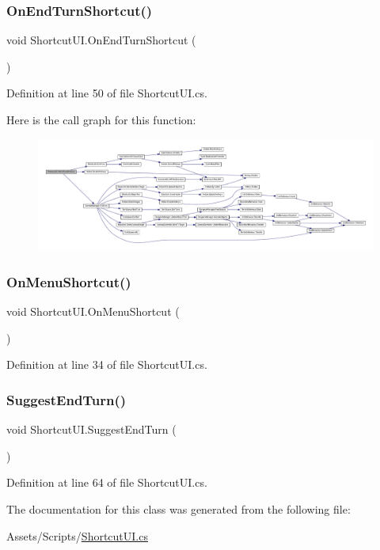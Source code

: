 \subsubsection{\texorpdfstring{OnEndTurnShortcut()}{OnEndTurnShortcut()}}
{\footnotesize\ttfamily void Shortcut\+U\+I.\+On\+End\+Turn\+Shortcut (\begin{DoxyParamCaption}{ }\end{DoxyParamCaption})}



Definition at line 50 of file Shortcut\+U\+I.\+cs.

Here is the call graph for this function\+:
\nopagebreak
\begin{figure}[H]
\begin{center}
\leavevmode
\includegraphics[width=350pt]{class_shortcut_u_i_ac6c1705acfb6d8393f36a73810d94958_cgraph}
\end{center}
\end{figure}
\mbox{\label{class_shortcut_u_i_a71824a1037ebef08af0938c0d731a498}} 
\subsubsection{\texorpdfstring{OnMenuShortcut()}{OnMenuShortcut()}}
{\footnotesize\ttfamily void Shortcut\+U\+I.\+On\+Menu\+Shortcut (\begin{DoxyParamCaption}{ }\end{DoxyParamCaption})}



Definition at line 34 of file Shortcut\+U\+I.\+cs.

\mbox{\label{class_shortcut_u_i_a501d7c10166dca42125d04c805c617d1}} 
\subsubsection{\texorpdfstring{SuggestEndTurn()}{SuggestEndTurn()}}
{\footnotesize\ttfamily void Shortcut\+U\+I.\+Suggest\+End\+Turn (\begin{DoxyParamCaption}{ }\end{DoxyParamCaption})}



Definition at line 64 of file Shortcut\+U\+I.\+cs.



The documentation for this class was generated from the following file\+:\begin{DoxyCompactItemize}
\item 
Assets/\+Scripts/\mbox{\hyperlink{_shortcut_u_i_8cs}{Shortcut\+U\+I.\+cs}}\end{DoxyCompactItemize}
